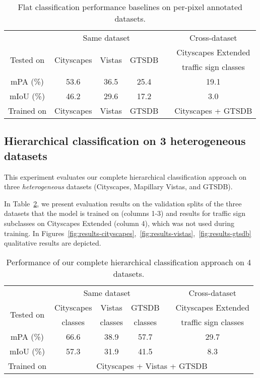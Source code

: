\documentclass[letterpaper, 10 pt, conference]{ieeeconf}
\begin{document}
\begin{table}
	\setlength\tabcolsep{3.5pt}
	\caption{Flat classification performance baselines on per-pixel annotated datasets.}
	\label{tab:flat-baselines}
	\begin{center}
		\begin{tabular}{c||c|c|ccc}
			& \multicolumn{3}{c}{Same dataset} & & Cross-dataset\\
			\cline{2-4} \cline{6-6}
			\multirow{2}{*}{Tested on} & \multirow{2}{*}{Cityscapes} & \multirow{2}{*}{Vistas} & \multirow{2}{*}{GTSDB}  & & Cityscapes Extended\\
			& & & & & traffic sign classes\\
			\cline{1-4} \cline{6-6}
			mPA (\%) & 53.6 & 36.5 & 25.4 & & 19.1\\
			mIoU (\%) & 46.2 & 29.6 & 17.2 & & 3.0\\
			\cline{1-4} \cline{6-6}
			Trained on & Cityscapes & Vistas & GTSDB & & Cityscapes + GTSDB
		\end{tabular}
	\end{center}
\end{table}

\subsection{Hierarchical classification on 3 heterogeneous datasets}
This experiment evaluates our complete hierarchical classification approach on three \textit{heterogeneous} datasets (Cityscapes, Mapillary Vistas, and GTSDB).

In Table~\ref{tab:hierarchical}, we present evaluation results on the validation splits of the three datasets that the model is trained on (columns 1-3) and results for traffic sign subclasses on Cityscapes Extended (column 4), which was not used during training. In Figures~\ref{fig:results-cityscapes},~\ref{fig:results-vistas},~\ref{fig:results-gtsdb} qualitative results are depicted.

\begin{table}
\setlength\tabcolsep{3.5pt}
	\caption{Performance of our complete hierarchical classification approach on 4 datasets.}
	\label{tab:hierarchical}
	\begin{center}
		\begin{tabular}{c||c|c|ccc}
			& \multicolumn{3}{c}{Same dataset} & & Cross-dataset\\
			\cline{2-4} \cline{6-6}
			\multirow{2}{*}{Tested on} & Cityscapes & Vistas & GTSDB & & {Cityscapes Extended}\\
			& classes & classes & classes & & traffic sign classes\\
			\cline{1-4} \cline{6-6}
			mPA (\%) & 66.6 & 38.9 & 57.7 & & 29.7\\
			mIoU (\%) & 57.3 & 31.9 & 41.5 & & 8.3\\
			\cline{1-6}
			Trained on & \multicolumn{5}{c}{Cityscapes + Vistas + GTSDB}
		\end{tabular}
	\end{center}
\end{table}
\end{document}
